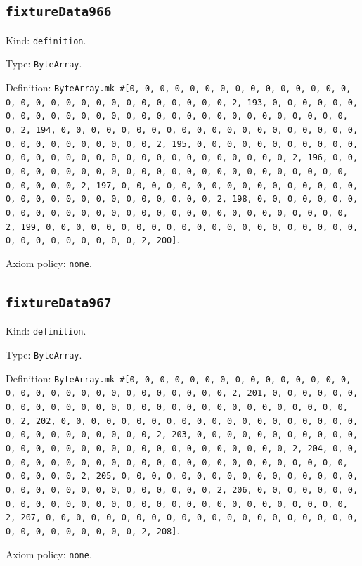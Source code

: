 \documentclass[11pt]{article}
\begin{document}
\subsection*{\texttt{fixtureData966}}
\noindent Kind: \texttt{definition}.\par
\noindent Type: \texttt{ByteArray}.\par
\noindent Definition: \texttt{ByteArray.mk \#[0, 0, 0, 0, 0, 0, 0, 0, 0, 0, 0, 0, 0, 0, 0, 0, 0, 0, 0, 0, 0, 0, 0, 0, 0, 0, 0, 0, 0, 0, 2, 193, 0, 0, 0, 0, 0, 0, 0, 0, 0, 0, 0, 0, 0, 0, 0, 0, 0, 0, 0, 0, 0, 0, 0, 0, 0, 0, 0, 0, 0, 0, 2, 194, 0, 0, 0, 0, 0, 0, 0, 0, 0, 0, 0, 0, 0, 0, 0, 0, 0, 0, 0, 0, 0, 0, 0, 0, 0, 0, 0, 0, 0, 0, 2, 195, 0, 0, 0, 0, 0, 0, 0, 0, 0, 0, 0, 0, 0, 0, 0, 0, 0, 0, 0, 0, 0, 0, 0, 0, 0, 0, 0, 0, 0, 0, 2, 196, 0, 0, 0, 0, 0, 0, 0, 0, 0, 0, 0, 0, 0, 0, 0, 0, 0, 0, 0, 0, 0, 0, 0, 0, 0, 0, 0, 0, 0, 0, 2, 197, 0, 0, 0, 0, 0, 0, 0, 0, 0, 0, 0, 0, 0, 0, 0, 0, 0, 0, 0, 0, 0, 0, 0, 0, 0, 0, 0, 0, 0, 0, 2, 198, 0, 0, 0, 0, 0, 0, 0, 0, 0, 0, 0, 0, 0, 0, 0, 0, 0, 0, 0, 0, 0, 0, 0, 0, 0, 0, 0, 0, 0, 0, 2, 199, 0, 0, 0, 0, 0, 0, 0, 0, 0, 0, 0, 0, 0, 0, 0, 0, 0, 0, 0, 0, 0, 0, 0, 0, 0, 0, 0, 0, 0, 0, 2, 200]}.\par
\noindent Axiom policy: \texttt{none}.\par
\subsection*{\texttt{fixtureData967}}
\noindent Kind: \texttt{definition}.\par
\noindent Type: \texttt{ByteArray}.\par
\noindent Definition: \texttt{ByteArray.mk \#[0, 0, 0, 0, 0, 0, 0, 0, 0, 0, 0, 0, 0, 0, 0, 0, 0, 0, 0, 0, 0, 0, 0, 0, 0, 0, 0, 0, 0, 0, 2, 201, 0, 0, 0, 0, 0, 0, 0, 0, 0, 0, 0, 0, 0, 0, 0, 0, 0, 0, 0, 0, 0, 0, 0, 0, 0, 0, 0, 0, 0, 0, 2, 202, 0, 0, 0, 0, 0, 0, 0, 0, 0, 0, 0, 0, 0, 0, 0, 0, 0, 0, 0, 0, 0, 0, 0, 0, 0, 0, 0, 0, 0, 0, 2, 203, 0, 0, 0, 0, 0, 0, 0, 0, 0, 0, 0, 0, 0, 0, 0, 0, 0, 0, 0, 0, 0, 0, 0, 0, 0, 0, 0, 0, 0, 0, 2, 204, 0, 0, 0, 0, 0, 0, 0, 0, 0, 0, 0, 0, 0, 0, 0, 0, 0, 0, 0, 0, 0, 0, 0, 0, 0, 0, 0, 0, 0, 0, 2, 205, 0, 0, 0, 0, 0, 0, 0, 0, 0, 0, 0, 0, 0, 0, 0, 0, 0, 0, 0, 0, 0, 0, 0, 0, 0, 0, 0, 0, 0, 0, 2, 206, 0, 0, 0, 0, 0, 0, 0, 0, 0, 0, 0, 0, 0, 0, 0, 0, 0, 0, 0, 0, 0, 0, 0, 0, 0, 0, 0, 0, 0, 0, 2, 207, 0, 0, 0, 0, 0, 0, 0, 0, 0, 0, 0, 0, 0, 0, 0, 0, 0, 0, 0, 0, 0, 0, 0, 0, 0, 0, 0, 0, 0, 0, 2, 208]}.\par
\noindent Axiom policy: \texttt{none}.\par
\end{document}
